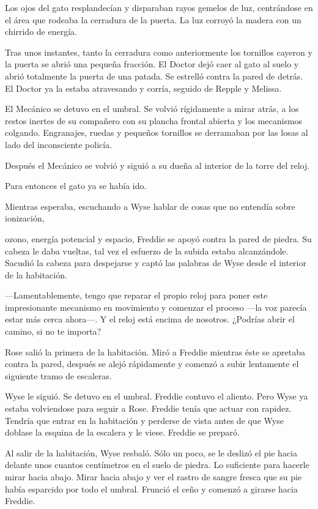 {Los ojos del gato resplandecían y disparaban rayos gemelos de luz,
	centrándose en el área que rodeaba la cerradura de la puerta. La luz
corroyó la madera con un chirrido de energía.}

{Tras unos instantes, tanto la cerradura como anteriormente los
	tornillos cayeron y la puerta se abrió una pequeña fracción. El
	Doctor dejó caer al gato al suelo y abrió totalmente la puerta de una
	patada. Se estrelló contra la pared de detrás. El Doctor ya la
estaba atravesando y corría, seguido de Repple y Melissa.}

{El Mecánico se detuvo en el umbral. Se volvió rígidamente a mirar
	atrás, a los restos inertes de su compañero con su plancha frontal
	abierta y los mecanismos colgando. Engranajes, ruedas y pequeños
tornillos se derramaban por las losas al lado del inconsciente policía.}

{Después el Mecánico se volvió y siguió a su dueña al interior de la
torre del reloj.}

{Para entonces el gato ya se había ido.}

{Mientras esperaba, escuchando a Wyse hablar de cosas que no entendía
sobre ionización,}

{ozono, energía potencial y espacio, Freddie se apoyó contra la pared de
	piedra. Su cabeza le daba vueltas, tal vez el esfuerzo de la subida
	estaba alcanzándole. Sacudió la cabeza para despejarse y captó las
palabras de Wyse desde el interior de la habitación.}

{---Lamentablemente, tengo que reparar el propio reloj para poner este
	impresionante mecanismo en movimiento y comenzar el proceso ---la voz
	parecía estar más cerca ahora---. Y el reloj está encima de
nosotros. ¿Podrías abrir el camino, si no te importa?}

{Rose salió la primera de la habitación. Miró a Freddie mientras
	éste se apretaba contra la pared, después se alejó rápidamente y comenzó
a subir lentamente el siguiente tramo de escaleras.}

{Wyse le siguió. Se detuvo en el umbral. Freddie contuvo el
	aliento. Pero Wyse ya estaba volviendose para seguir a
	Rose. Freddie tenía que actuar con rapidez. Tendría que entrar
	en la habitación y perderse de vista antes de que Wyse doblase la
esquina de la escalera y le viese. Freddie se preparó.}

{Al salir de la habitación, Wyse resbaló. Sólo un poco, se le
	deslizó el pie hacia delante unos cuantos centímetros en el suelo de
	piedra. Lo suficiente para hacerle mirar hacia abajo. Mirar
	hacia abajo y ver el rastro de sangre fresca que su pie había esparcido
	por todo el umbral. Frunció el ceño y comenzó a girarse hacia
Freddie.}

